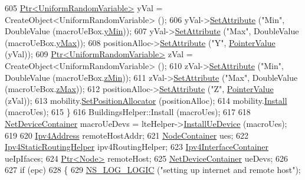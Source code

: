 \begin{DoxyCode}
605       \hyperlink{classns3_1_1Ptr}{Ptr<UniformRandomVariable>} yVal = CreateObject<UniformRandomVariable> ();
606       yVal->\hyperlink{classns3_1_1ObjectBase_ac60245d3ea4123bbc9b1d391f1f6592f}{SetAttribute} (\textcolor{stringliteral}{"Min"}, DoubleValue (macroUeBox.\hyperlink{classns3_1_1Box_a3865ed092f941186823539c9979002f8}{yMin}));
607       yVal->\hyperlink{classns3_1_1ObjectBase_ac60245d3ea4123bbc9b1d391f1f6592f}{SetAttribute} (\textcolor{stringliteral}{"Max"}, DoubleValue (macroUeBox.\hyperlink{classns3_1_1Box_a001fd430a14b19efe925c818a332e392}{yMax}));
608       positionAlloc->\hyperlink{classns3_1_1ObjectBase_ac60245d3ea4123bbc9b1d391f1f6592f}{SetAttribute} (\textcolor{stringliteral}{"Y"}, \hyperlink{classns3_1_1PointerValue}{PointerValue} (yVal));
609       \hyperlink{classns3_1_1Ptr}{Ptr<UniformRandomVariable>} zVal = CreateObject<UniformRandomVariable> ();
610       zVal->\hyperlink{classns3_1_1ObjectBase_ac60245d3ea4123bbc9b1d391f1f6592f}{SetAttribute} (\textcolor{stringliteral}{"Min"}, DoubleValue (macroUeBox.\hyperlink{classns3_1_1Box_a9ab297b877a5c31dbfb344bd6f027e91}{zMin}));
611       zVal->\hyperlink{classns3_1_1ObjectBase_ac60245d3ea4123bbc9b1d391f1f6592f}{SetAttribute} (\textcolor{stringliteral}{"Max"}, DoubleValue (macroUeBox.\hyperlink{classns3_1_1Box_ae4d135764bbc8421fe82ec91e4693b59}{zMax}));
612       positionAlloc->\hyperlink{classns3_1_1ObjectBase_ac60245d3ea4123bbc9b1d391f1f6592f}{SetAttribute} (\textcolor{stringliteral}{"Z"}, \hyperlink{classns3_1_1PointerValue}{PointerValue} (zVal));
613       mobility.\hyperlink{classns3_1_1MobilityHelper_ac59d5295076be3cc11021566713a28c5}{SetPositionAllocator} (positionAlloc);
614       mobility.\hyperlink{classns3_1_1MobilityHelper_a07737960ee95c0777109cf2994dd97ae}{Install} (macroUes);
615     \}
616   BuildingsHelper::Install (macroUes);
617 
618   \hyperlink{classns3_1_1NetDeviceContainer}{NetDeviceContainer} macroUeDevs = lteHelper->\hyperlink{classns3_1_1LteHelper_ac9cd932d7de92811cfa953c2e3b2fc9f}{InstallUeDevice} (macroUes);
619 
620   \hyperlink{classns3_1_1Ipv4Address}{Ipv4Address} remoteHostAddr;
621   \hyperlink{classns3_1_1NodeContainer}{NodeContainer} ues;
622   \hyperlink{classns3_1_1Ipv4StaticRoutingHelper}{Ipv4StaticRoutingHelper} ipv4RoutingHelper;
623   \hyperlink{classns3_1_1Ipv4InterfaceContainer}{Ipv4InterfaceContainer} ueIpIfaces;
624   \hyperlink{classns3_1_1Ptr}{Ptr<Node>} remoteHost;
625   \hyperlink{classns3_1_1NetDeviceContainer}{NetDeviceContainer} ueDevs;
626 
627   \textcolor{keywordflow}{if} (epc)
628     \{
629       \hyperlink{group__logging_ga88acd260151caf2db9c0fc84997f45ce}{NS\_LOG\_LOGIC} (\textcolor{stringliteral}{"setting up internet and remote host"});

\end{DoxyCode}
